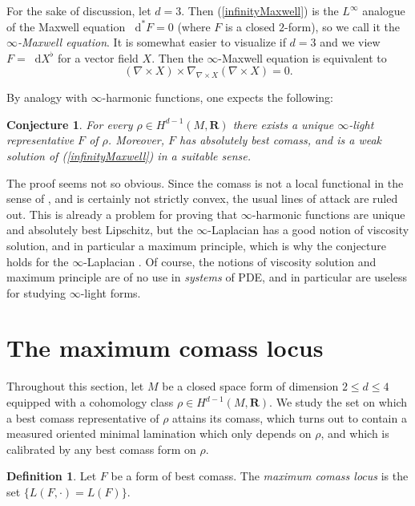 \documentclass[reqno,11pt]{amsart}
\newcommand{\RR}{\mathbf{R}}
\newcommand*\dif{\mathop{}\!\mathrm{d}}
\newcommand{\dfn}[1]{\emph{#1}\index{#1}}
\newtheorem{conjecture}[theorem]{Conjecture}
\theoremstyle{definition}
\newtheorem{definition}[theorem]{Definition}
\numberwithin{equation}{section}
\begin{document}
For the sake of discussion, let $d = 3$.
Then (\ref{infinityMaxwell}) is the $L^\infty$ analogue of the Maxwell equation $\dif^* F = 0$ (where $F$ is a closed $2$-form), so we call it the \dfn{$\infty$-Maxwell equation}.
It is somewhat easier to visualize if $d = 3$ and we view $F = \dif X^\flat$ for a vector field $X$.
Then the $\infty$-Maxwell equation is equivalent to
$$(\nabla \times X) \times \nabla_{\nabla \times X} (\nabla \times X) = 0.$$

By analogy with $\infty$-harmonic functions, one expects the following:

\begin{conjecture}
For every $\rho \in H^{d - 1}(M, \RR)$ there exists a unique $\infty$-light representative $F$ of $\rho$.
Moreover, $F$ has absolutely best comass, and is a weak solution of (\ref{infinityMaxwell}) in a suitable sense.
\end{conjecture}

The proof seems not so obvious.
Since the comass is not a local functional in the sense of \cite{Crandall2008}, and is certainly not strictly convex, the usual lines of attack are ruled out.
This is already a problem for proving that $\infty$-harmonic functions are unique and absolutely best Lipschitz, but the $\infty$-Laplacian has a good notion of viscosity solution, and in particular a maximum principle, which is why the conjecture holds for the $\infty$-Laplacian \cite{Lindqvist14}.
Of course, the notions of viscosity solution and maximum principle are of no use in \emph{systems} of PDE, and in particular are useless for studying $\infty$-light forms.


\section{The maximum comass locus}
Throughout this section, let $M$ be a closed space form of dimension $2 \leq d \leq 4$ equipped with a cohomology class $\rho \in H^{d - 1}(M, \RR)$.
We study the set on which a best comass representative of $\rho$ attains its comass, which turns out to contain a measured oriented minimal lamination which only depends on $\rho$, and which is calibrated by any best comass form on $\rho$.

\begin{definition}
Let $F$ be a form of best comass.
The \dfn{maximum comass locus} is the set $\{L(F, \cdot) = L(F)\}$.
\end{definition}
\end{document}
